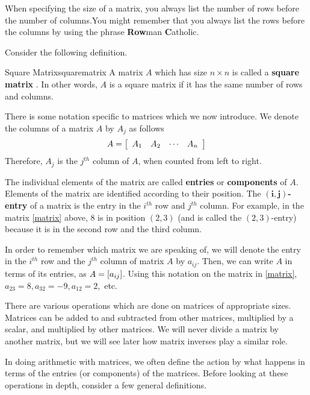 When specifying the size of a matrix, you always list the number
of rows before the number of columns.You
might remember that you always list the rows before the columns by using the
phrase \textbf{Row}man \textbf{C}atholic. 

Consider the following definition.

\begin{definition}{Square Matrix}{squarematrix}
A matrix $A$ which has size $n \times n$ is called a \textbf{square matrix} .
In other words, $A$ is a square matrix if it has the same number of rows
and columns.
\end{definition}

There is some notation specific to matrices which we now introduce. We denote the columns of a matrix $A$ 
by $A_{j}$ as follows
\begin{equation*}
A = 
\left[
\begin{array}{rrrr}
A_{1} & A_{2} & \cdots & A_{n}
\end{array}
\right]
\end{equation*}
Therefore, $A_{j}$ is the $j^{th}$ column of $A$, when counted from left to right. 

The individual elements of the matrix are called \textbf{entries}  or \textbf{components}  of $A$. Elements of the matrix
are identified according to their position. The $\mathbf{\left( i, j \right)}$\textbf{-entry} of a matrix is the entry 
in the $i^{th}$ row and $j^{th}$ column. For example, in the matrix \ref{matrix} above,  $8$ is in
position $\left(2,3 \right)$ (and is called the $\left(2,3 \right)$-entry) because it is in the second row and the third column. 

In order to remember which matrix we are speaking of, we 
will denote the entry in the $i^{th}$ row  and the $j^{th}$ column of matrix $A$ by $a_{ij}$. Then, we can write $A$ in terms of its entries,
as $A= \left[ a_{ij} \right]$. Using this notation on the matrix in \ref{matrix},
$a_{23}=8, a_{32}=-9, a_{12}=2,$ etc.

There are various operations which are done on matrices of appropriate
sizes. Matrices can be added to and subtracted from other matrices,
multiplied by a scalar, and multiplied by other matrices. We will
never divide a matrix by another matrix, but we will see later how matrix inverses play a similar role. 

In doing arithmetic with matrices, we often define the action by what
happens in terms of the entries (or components) of the
matrices. Before looking at these operations in depth, consider a few
general definitions.

